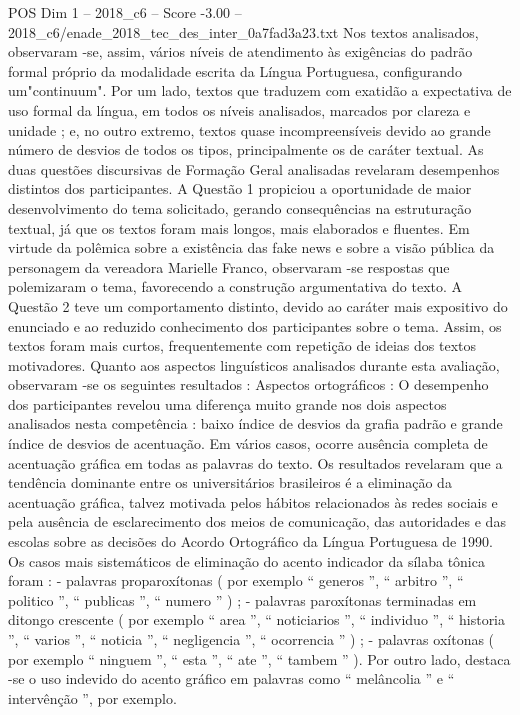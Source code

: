 \begin{textsample}{POS Dim 1 – 2018\_c6 – Score -3.00 – 2018\_c6/enade\_2018\_tec\_des\_inter\_0a7fad3a23.txt}
Nos textos analisados, observaram -se, assim, vários níveis de atendimento às exigências do padrão formal próprio da modalidade escrita da Língua Portuguesa, configurando um"continuum".
Por um lado, textos que traduzem com exatidão a expectativa de uso formal da língua, em todos os níveis analisados, marcados por clareza e unidade ; e, no outro extremo, textos quase incompreensíveis devido ao grande número de desvios de todos os tipos, principalmente os de caráter textual.
As duas questões discursivas de Formação Geral analisadas revelaram desempenhos distintos dos participantes.
A Questão 1 propiciou a oportunidade de maior desenvolvimento do tema solicitado, gerando consequências na estruturação textual, já que os textos foram mais longos, mais elaborados e fluentes.
Em virtude da polêmica sobre a existência das fake news e sobre a visão pública da personagem da vereadora Marielle Franco, observaram -se respostas que polemizaram o tema, favorecendo a construção argumentativa do texto.
A Questão 2 teve um comportamento distinto, devido ao caráter mais expositivo do enunciado e ao reduzido conhecimento dos participantes sobre o tema.
Assim, os textos foram mais curtos, frequentemente com repetição de ideias dos textos motivadores.
Quanto aos aspectos linguísticos analisados durante esta avaliação, observaram -se os seguintes resultados : Aspectos ortográficos : O desempenho dos participantes revelou uma diferença muito grande nos dois aspectos analisados nesta competência : baixo índice de desvios da grafia padrão e grande índice de desvios de acentuação.
Em vários casos, ocorre ausência completa de acentuação gráfica em todas as palavras do texto.
Os resultados revelaram que a tendência dominante entre os universitários brasileiros é a eliminação da acentuação gráfica, talvez motivada pelos hábitos relacionados às redes sociais e pela ausência de esclarecimento dos meios de comunicação, das autoridades e das escolas sobre as decisões do Acordo Ortográfico da Língua Portuguesa de 1990.
Os casos mais sistemáticos de eliminação do acento indicador da sílaba tônica foram : - palavras proparoxítonas ( por exemplo “ generos ”, “ arbitro ”, “ politico ”, “ publicas ”, “ numero ” ) ; - palavras paroxítonas terminadas em ditongo crescente ( por exemplo “ area ”, “ noticiarios ”, “ individuo ”, “ historia ”, “ varios ”, “ noticia ”, “ negligencia ”, “ ocorrencia ” ) ; - palavras oxítonas ( por exemplo “ ninguem ”, “ esta ”, “ ate ”, “ tambem ” ).
Por outro lado, destaca -se o uso indevido do acento gráfico em palavras como “ melâncolia ” e “ intervênção ”, por exemplo.

\end{textsample}
